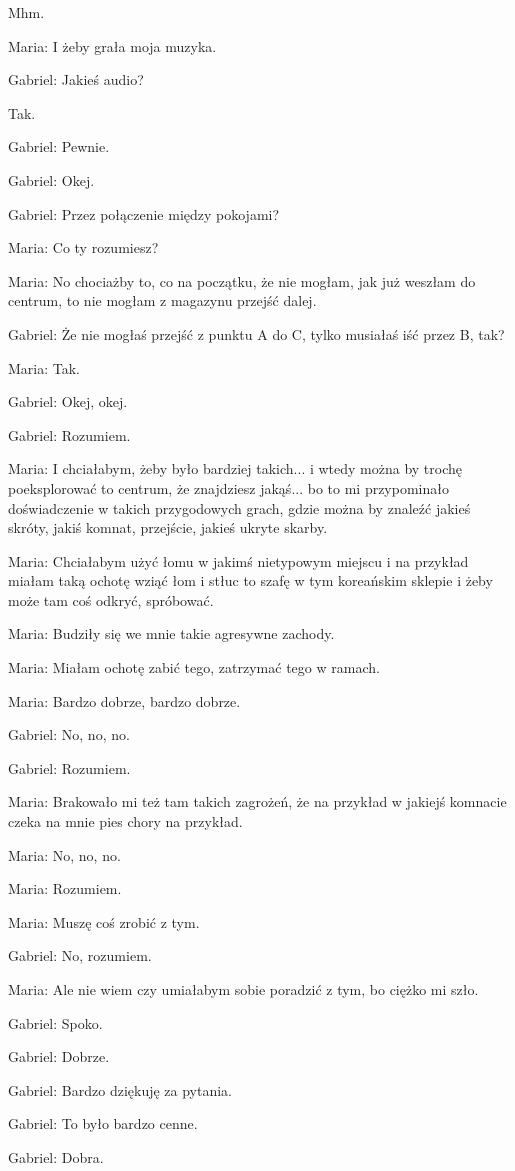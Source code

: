 Mhm.

Maria: I żeby grała moja muzyka.

Gabriel: Jakieś audio?

Tak.

Gabriel: Pewnie.

Gabriel: Okej.

Gabriel: Przez połączenie między pokojami?

Maria: Co ty rozumiesz?

Maria: No chociażby to, co na początku, że nie mogłam, jak już weszłam do centrum, to nie mogłam z magazynu przejść dalej.

Gabriel: Że nie mogłaś przejść z punktu A do C, tylko musiałaś iść przez B, tak?

Maria: Tak.

Gabriel: Okej, okej.

Gabriel: Rozumiem.

Maria: I chciałabym, żeby było bardziej takich... i wtedy można by trochę poeksplorować to centrum, że znajdziesz jakąś... bo to mi przypominało doświadczenie w takich przygodowych grach, gdzie można by znaleźć jakieś skróty, jakiś komnat, przejście, jakieś ukryte skarby.

Maria: Chciałabym użyć łomu w jakimś nietypowym miejscu i na przykład miałam taką ochotę wziąć łom i stłuc to szafę w tym koreańskim sklepie i żeby może tam coś odkryć, spróbować.

Maria: Budziły się we mnie takie agresywne zachody.

Maria: Miałam ochotę zabić tego, zatrzymać tego w ramach.

Maria: Bardzo dobrze, bardzo dobrze.

Gabriel: No, no, no.

Gabriel: Rozumiem.

Maria: Brakowało mi też tam takich zagrożeń, że na przykład w jakiejś komnacie czeka na mnie pies chory na przykład.

Maria: No, no, no.

Maria: Rozumiem.

Maria: Muszę coś zrobić z tym.

Gabriel: No, rozumiem.

Maria: Ale nie wiem czy umiałabym sobie poradzić z tym, bo ciężko mi szło.

Gabriel: Spoko.

Gabriel: Dobrze.

Gabriel: Bardzo dziękuję za pytania.

Gabriel: To było bardzo cenne.

Gabriel: Dobra.